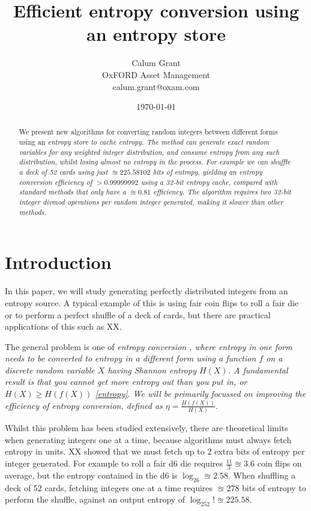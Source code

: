 \documentclass[12pt]{article}
\title{Efficient entropy conversion using an entropy store}
\author{Calum Grant \\
OxFORD Asset Management \\
calum.grant@oxam.com}
\date{\today}
\begin{document}
\maketitle

\begin{abstract}
    We present new algorithms for converting random integers between different forms using an \em entropy store \em to cache entropy. The method can generate exact random variables for any weighted integer distribution, and consume entropy from any such distribution, whilst losing almost no entropy in the process.  For example we can shuffle a deck of 52 cards using just $\approxeq 225.58102$ bits of entropy, yielding an entropy conversion efficiency of $>0.99999992$ using a 32-bit entropy cache, compared with standard methods that only have a $\approxeq 0.81$ efficiency.  The algorithm requires two 32-bit integer divmod operations per random integer generated, making it slower than other methods.
\end{abstract}

\section{Introduction}

In this paper, we will study generating perfectly distributed integers from an entropy source. A typical example of this is using fair coin flips to roll a fair die or to perform a perfect shuffle of a deck of cards, but there are practical applications of this such as XX.

The general problem is one of \em entropy conversion \em, where entropy in one form needs to be converted to entropy in a different form using a function $f$ on a discrete random variable $X$ having Shannon entropy $H(X)$.  A fundamental result is that you cannot get more entropy out than you put in, or $H(X) \ge H(f(X))$ \ref{entropy}. We will be primarily focussed on improving the \em efficiency \em of entropy conversion, defined as $\eta = \frac{H(f(X))}{H(X)}$.

Whilst this problem has been studied extensively, there are theoretical limits when generating integers one at a time, because algorithms must always fetch entropy in units. XX showed that we must fetch up to 2 extra bits of entropy per integer generated.  For example to roll a fair d6 die requires $\frac{11}{3} \approxeq 3.6$ coin flips on average, but the entropy contained in the d6 is $\log_26 \approxeq 2.58$. When shuffling a deck of 52 cards, fetching integers one at a time requires $\approxeq 278$ bits of entropy to perform the shuffle, against an output entropy of $\log_252! \approxeq 225.58$.
\end{document}
